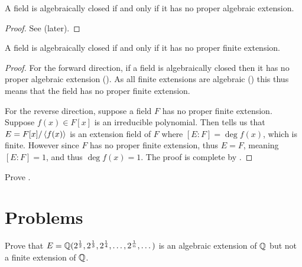 \begin{corollary}\label{corollary-field-is-algebraically-closed-iff-no-proper-algebraic-extension}
    A field is algebraically closed if and only if it has no proper algebraic extension.
\end{corollary}
\begin{proof}
    See  (later).
\end{proof}

\begin{corollary}\label{corollary-field-is-algebraically-closed-iff-no-proper-finite-extension}
    A field is algebraically closed if and only if it has no proper finite extension.
\end{corollary}
\begin{proof}
    For the forward direction, if a field is algebraically closed then it has no proper algebraic extension (). As all finite extensions are algebraic () this thus means that the field has no proper finite extension.

    For the reverse direction, suppose a field $F$ has no proper finite extension. Suppose $f(x) \in F[x]$ is an irreducible polynomial. Then  tells us that $E = F[x]/\left\langle f(x)\right\rangle$ is an extension field of $F$ where $[E:F] = \deg f(x)$, which is finite. However since $F$ has no proper finite extension, thus $E = F$, meaning $[E:F] = 1$, and thus $\deg f(x) = 1$. The proof is complete by .
\end{proof}

\begin{exercise}\label{exercise-field-is-algebraically-closed-iff-no-proper-algebraic-extension}
    Prove .
\end{exercise}

\newpage

\section{Problems}
\begin{problem}
    Prove that $E = \mathbb{Q}(2^{\frac12}, 2^{\frac13}, 2^{\frac14}, \dots, 2^{\frac1n}, \dots)$ is an algebraic extension of $\mathbb{Q}$ but not a finite extension of $\mathbb{Q}$.
\end{problem}

